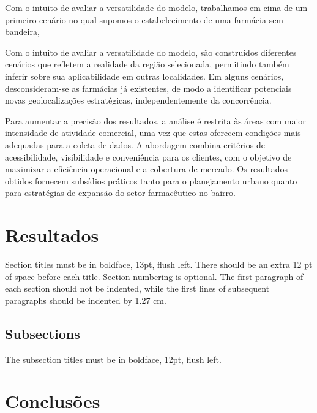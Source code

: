 \documentclass[12pt]{article}
\begin{document}
Com o intuito de avaliar a versatilidade do modelo, trabalhamos em cima de um primeiro cenário no qual supomos o estabelecimento de uma farmácia sem bandeira, 

Com o intuito de avaliar a versatilidade do modelo, são construídos diferentes cenários que refletem a realidade da região selecionada, permitindo também inferir sobre sua aplicabilidade em outras localidades. Em alguns cenários, desconsideram-se as farmácias já existentes, de modo a identificar potenciais novas geolocalizações estratégicas, independentemente da concorrência.

Para aumentar a precisão dos resultados, a análise é restrita às áreas com maior intensidade de atividade comercial, uma vez que estas oferecem condições mais adequadas para a coleta de dados. A abordagem combina critérios de acessibilidade, visibilidade e conveniência para os clientes, com o objetivo de maximizar a eficiência operacional e a cobertura de mercado. Os resultados obtidos fornecem subsídios práticos tanto para o planejamento urbano quanto para estratégias de expansão do setor farmacêutico no bairro.

\section{Resultados}

Section titles must be in boldface, 13pt, flush left. There should be an extra
12 pt of space before each title. Section numbering is optional. The first
paragraph of each section should not be indented, while the first lines of
subsequent paragraphs should be indented by 1.27 cm.

\subsection{Subsections}

The subsection titles must be in boldface, 12pt, flush left.

\section{Conclusões}\label{sec:figs}
\end{document}
